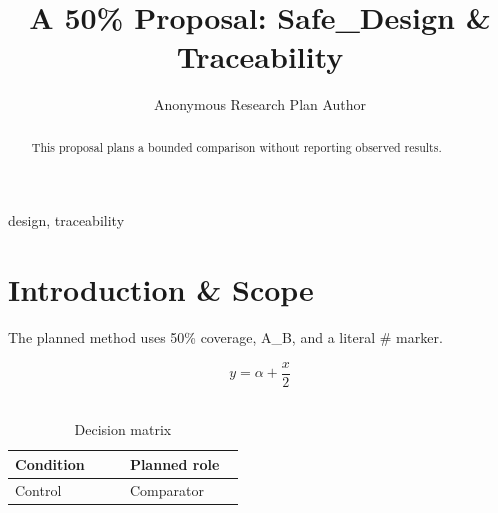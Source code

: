 \documentclass[conference]{IEEEtran}
\begin{document}
\title{A 50\% Proposal: Safe\_Design \& Traceability}\author{Anonymous Research Plan Author}\maketitle

\begin{abstract}
This proposal plans a bounded comparison without reporting observed results.
\end{abstract}
\begin{IEEEkeywords}
design, traceability
\end{IEEEkeywords}\section{Introduction \& Scope}
The planned method uses 50\% coverage, A\_B, and a literal \# marker.~\cite{cite_example_1}

\begin{equation}
y = \alpha + \frac{x}{2}
\label{eq:introduction-B2}
\end{equation}~\cite{cite_example_1}

\begin{table}[htbp]
\centering
\small


\caption{Decision matrix}
\label{tab:introduction-B3}
\begin{tabular}{|p{0.45\linewidth}|p{0.45\linewidth}|}
\hline
Condition & Planned role \\\hline
Control & Comparator \\\hline
\end{tabular}
\end{table}~\cite{cite_example_1}

\end{document}
